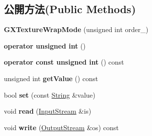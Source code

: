 \subsection*{公開方法(Public Methods)}
\begin{DoxyCompactItemize}
\item 
{\bfseries G\+X\+Texture\+Wrap\+Mode} (unsigned int order\+\_)\hypertarget{class_magnum_1_1_g_x_texture_wrap_mode_a9607d876041dcb571bc56fcba43c9bb4}{}\label{class_magnum_1_1_g_x_texture_wrap_mode_a9607d876041dcb571bc56fcba43c9bb4}

\item 
{\bfseries operator unsigned int} ()\hypertarget{class_magnum_1_1_g_x_texture_wrap_mode_a53d56603cdda9cf68eeb75249d08b115}{}\label{class_magnum_1_1_g_x_texture_wrap_mode_a53d56603cdda9cf68eeb75249d08b115}

\item 
{\bfseries operator const unsigned int} () const \hypertarget{class_magnum_1_1_g_x_texture_wrap_mode_a7c1482f45e520be14c014305020b3d1d}{}\label{class_magnum_1_1_g_x_texture_wrap_mode_a7c1482f45e520be14c014305020b3d1d}

\item 
unsigned int {\bfseries get\+Value} () const \hypertarget{class_magnum_1_1_g_x_texture_wrap_mode_a4a388d4457a5da3438f7147f66532a32}{}\label{class_magnum_1_1_g_x_texture_wrap_mode_a4a388d4457a5da3438f7147f66532a32}

\item 
bool {\bfseries set} (const \hyperlink{class_magnum_1_1_string}{String} \&value)\hypertarget{class_magnum_1_1_g_x_texture_wrap_mode_ab8b1726e3fefffd50466cc568150d70e}{}\label{class_magnum_1_1_g_x_texture_wrap_mode_ab8b1726e3fefffd50466cc568150d70e}

\item 
void {\bfseries read} (\hyperlink{class_magnum_1_1_input_stream}{Input\+Stream} \&is)\hypertarget{class_magnum_1_1_g_x_texture_wrap_mode_ae0af8ca8c970f8c8ee134a8161848101}{}\label{class_magnum_1_1_g_x_texture_wrap_mode_ae0af8ca8c970f8c8ee134a8161848101}

\item 
void {\bfseries write} (\hyperlink{class_magnum_1_1_output_stream}{Output\+Stream} \&os) const \hypertarget{class_magnum_1_1_g_x_texture_wrap_mode_a7619ce3057dca40af9017f8daf38eef5}{}\label{class_magnum_1_1_g_x_texture_wrap_mode_a7619ce3057dca40af9017f8daf38eef5}

\end{DoxyCompactItemize}
